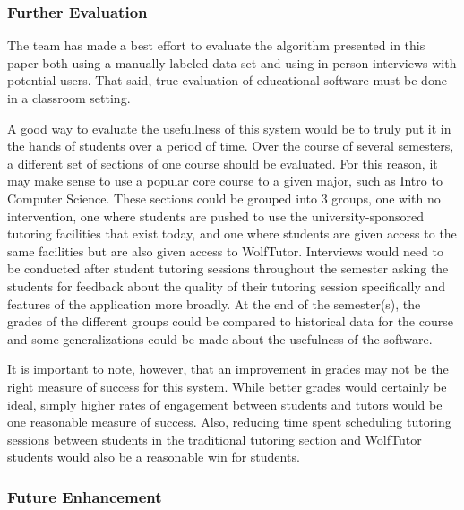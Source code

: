 \subsubsection{Further Evaluation}
\label{sec:further-evaluation}
The team has made a best effort to evaluate the algorithm presented in this
paper both using a manually-labeled data set and using in-person interviews with
potential users. That said, true evaluation of educational software must be done
in a classroom setting.  

A good way to evaluate the usefullness of this system would be to truly put it
in the hands of students over a period of time. Over the course of several
semesters, a different set of sections of one course should be evaluated.  For
this reason, it may make sense to use a popular core course to a given major,
such as Intro to Computer Science.  These sections could be grouped into 3
groups, one with no intervention, one where students are pushed to use the
university-sponsored tutoring facilities that exist today, and one where
students are given access to the same facilities but are also given access to
WolfTutor.  Interviews would need to be conducted after student tutoring
sessions throughout the semester asking the students for feedback about the
quality of their tutoring session specifically and features of the application
more broadly.  At the end of the semester(s), the grades of the different groups
could be compared to historical data for the course and some generalizations
could be made about the usefulness of the software.

It is important to note, however, that an improvement in grades may not be the
right measure of success for this system. While better grades would certainly be
ideal, simply higher rates of engagement between students and tutors would be
one reasonable measure of success. Also, reducing time spent scheduling tutoring
sessions between students in the traditional tutoring section and WolfTutor
students would also be a reasonable win for students.  

\subsubsection{Future Enhancement}
\label{sec:future-enhancement}

